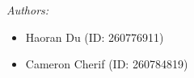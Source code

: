 \begin{titlepage}
\vspace{0.04cm}
\begin{flushleft} \large
\textit{Authors:}\\
\begin{itemize}
  \item Haoran Du (ID: 260776911)
  \item Cameron Cherif (ID: 260784819)
\end{itemize}
\end{flushleft}
\vspace{6.6cm}
\makeatletter
\begin{flushright} \large
\@date
\end{flushright}
\vfill %



\makeatother


\end{titlepage}
